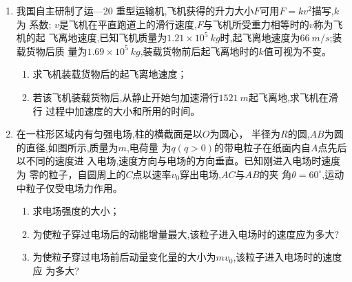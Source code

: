 \begin{enumerate}
\begin{enumerate}
\end{enumerate}






\newpage

\gaokaojs


\item 
我国自主研制了运---20 重型运输机,飞机获得的升力大小$ F $可用$ F=kv^{2} $描写,$ k $为
系数; $ v $是飞机在平直跑道上的滑行速度,$ F $与飞机所受重力相等时的$ v $称为飞机的起
飞离地速度,已知飞机质量为$ 1.21 \times 10^{5} \ kg $时,起飞离地速度为$ 66 \ m/s $;装载货物后质
量为$ 1.69 \times 10^{5} \ kg $,装载货物前后起飞离地时的$ k $值可视为不变。

\begin{enumerate}
\item
求飞机装载货物后的起飞离地速度；
\item 
若该飞机装载货物后,从静止开始匀加速滑行$ 1521 \ m $起飞离地,求飞机在滑行
过程中加速度的大小和所用的时间。





\end{enumerate}





\item 
在一柱形区域内有匀强电场,柱的横截面是以$ O $为圆心，
半径为$ R $的圆,$ AB $为圆的直径,如图所示,质量为$ m $,电荷量
为$ q(q>0) $的带电粒子在纸面内自$ A $点先后以不同的速度进
入电场,速度方向与电场的方向垂直。已知刚进入电场时速度为
零的粒子，自圆周上的$ C $点以速率$ v_{0} $穿出电场,$ AC $与$ AB $的夹
角$ \theta=60 ^{ \circ } $,运动中粒子仅受电场力作用。
\begin{enumerate}
\item
求电场强度的大小；
\item 
为使粒子穿过电场后的动能增量最大,该粒子进入电场时的速度应为多大?
\item 
为使粒子穿过电场前后动量变化量的大小为$ mv_{0} $,该粒子进入电场时的速度应
为多大?





\end{enumerate}
\end{enumerate}
